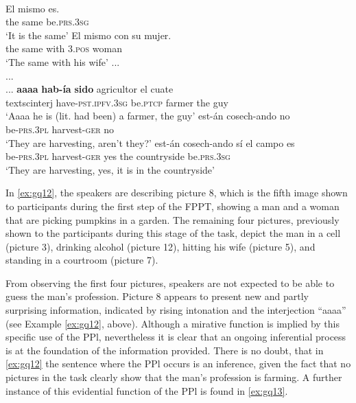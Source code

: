 \documentclass[output=paper]{langsci/langscibook}
\begin{document}
\ea \label{ex:gq12}
\\
	\ea \label{ex:gq12a}
	\gll El mismo es.\\
	the same be.\textsc{prs.3sg}\\
	\glt ‘It is the same’
	\ex \label{ex:gq12b}
	\gll  El mismo con su mujer.\\
	the same with \textsc{3.pos} woman\\
	\glt ‘The same with his wife’
	\ex  \label{ex:gq12c}
	\gll ...\\
	{...}\\
	\glt ...
	\ex \label{ex:gq12d}
	\gll \textbf{aaaa} \textbf{hab-ía} \textbf{sido} agricultor el cuate\\
	textsc{interj} have-\textsc{pst.ipfv.3sg} be.\textsc{ptcp} farmer the guy\\
	\glt ‘Aaaa he is (lit. had been) a farmer, the guy’
	\ex \label{ex:gq12e}
	\gll est-án cosech-ando no\\
	be-\textsc{prs.3pl} harvest-\textsc{ger} no\\
	\glt ‘They are harvesting, aren’t they?’
	\ex \label{ex:gq12f}
	\gll est-án cosech-ando sí el  campo es\\
	be-\textsc{prs.3pl} harvest-\textsc{ger} yes the countryside be.\textsc{prs.3sg}\\
	\glt ‘They are harvesting, yes, it is in the countryside’
	\z
\z

In \ref{ex:gq12}, the speakers are describing picture 8, which is the fifth image shown to participants during the first step of the FPPT, showing a man and a woman that are picking pumpkins in a garden. The remaining four pictures, previously shown to the participants during this stage of the task, depict the man in a cell (picture 3), drinking alcohol (picture 12), hitting his wife (picture 5), and standing in a courtroom (picture 7). %


From observing the first four pictures, speakers are not expected to be able to guess the man’s profession. Picture 8 appears to present new and partly surprising information, indicated by rising intonation and the interjection “aaaa” (see Example \ref{ex:gq12}, above). Although a mirative function is implied by this specific use of the PPl, nevertheless it is clear that an ongoing inferential process is at the foundation of the information provided. There is no doubt, that in \ref{ex:gq12} the sentence where the PPl occurs is an inference, given the fact that no pictures in the task clearly show that the man’s profession is farming. A further instance of this evidential function of the PPl is found in \ref{ex:gq13}. 
\end{document}
